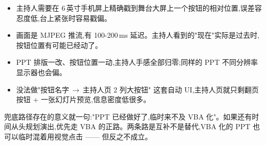 \begin{itemize}
  \item 主持人需要在 6\,英寸手机屏上精确戳到舞台大屏上一个按钮的相对位置,误差容忍度低,台上紧张时容易戳偏。
  \item 画面是 MJPEG 推流,有 100-200\,ms 延迟。主持人看到的"现在"实际是过去时,按钮位置有可能已经动了。
  \item PPT 排版一改、按钮位置一动,主持人手感全部归零;同样的 PPT 不同分辨率显示器也会偏。
  \item 没法做"按钮名字\,$\to$\,主持人页 2 列大按钮" 这套自动 UI,主持人页就只剩翻页按钮 + 一张幻灯片预览,信息密度低很多。
\end{itemize}

兜底路径存在的意义就一句:"PPT 已经做好了,临时来不及 VBA 化"。如果还有时间从头规划演出,优先走 VBA 的正路。两条路是互补不是替代,VBA 化的 PPT 也可以临时混着用视觉点击 —— 但反之不成立。
